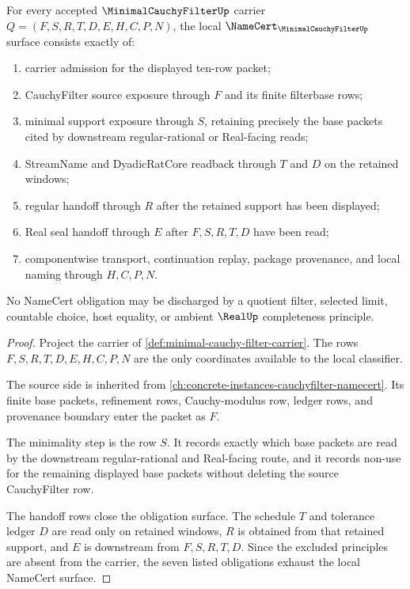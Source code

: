 \begin{theorem}\label{thm:minimal-cauchy-filter-namecert-obligations}
For every accepted $\MinimalCauchyFilterUp$ carrier $Q=(F,S,R,T,D,E,H,C,P,N)$, the local $\NameCert_{\MinimalCauchyFilterUp}$ surface consists exactly of:
\begin{enumerate}
\item carrier admission for the displayed ten-row packet;
\item CauchyFilter source exposure through $F$ and its finite filterbase rows;
\item minimal support exposure through $S$, retaining precisely the base packets cited by downstream regular-rational or Real-facing reads;
\item StreamName and DyadicRatCore readback through $T$ and $D$ on the retained windows;
\item regular handoff through $R$ after the retained support has been displayed;
\item Real seal handoff through $E$ after $F,S,R,T,D$ have been read;
\item componentwise transport, continuation replay, package provenance, and local naming through $H,C,P,N$.
\end{enumerate}
No NameCert obligation may be discharged by a quotient filter, selected limit, countable choice, host equality, or ambient $\RealUp$ completeness principle.
\end{theorem}
\begin{proof}
Project the carrier of \autoref{def:minimal-cauchy-filter-carrier}. The rows $F,S,R,T,D,E,H,C,P,N$ are the only coordinates available to the local classifier.

The source side is inherited from \autoref{ch:concrete-instances-cauchyfilter-namecert}. Its finite base packets, refinement rows, Cauchy-modulus row, ledger rows, and provenance boundary enter the packet as $F$.

The minimality step is the row $S$. It records exactly which base packets are read by the downstream regular-rational and Real-facing route, and it records non-use for the remaining displayed base packets without deleting the source CauchyFilter row.

The handoff rows close the obligation surface. The schedule $T$ and tolerance ledger $D$ are read only on retained windows, $R$ is obtained from that retained support, and $E$ is downstream from $F,S,R,T,D$. Since the excluded principles are absent from the carrier, the seven listed obligations exhaust the local NameCert surface.
\end{proof}

